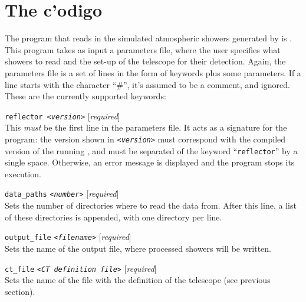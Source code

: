 \afterpage{\clearpage}

\clearpage

\section{The c'odigo }
\label{sec:reflector}
%
The program that reads in the simulated atmospheric showers generated
by \CORSIKA is . This program takes as input a parameters
file, where the user specifies what showers to read and the set-up of
the telescope for their detection. Again, the parameters file is a set
of lines in the form of keywords plus some parameters. If a line
starts with the character ``\#'', it's assumed to be a comment, and
ignored. These are the currently supported keywords:

\begin{Uentry}
  
\item[\texttt{reflector <\emph{version}>}]
%
  [\emph{required}] \\
  This \emph{must} be the first line in the parameters file. It acts
  as a signature for the program: the version shown in
  \texttt{<\emph{version}>} must correspond with the compiled version
  of the running , and must be separated of the keyword
  ``\texttt{reflector}'' by a single space.  Otherwise, an error
  message is displayed and the program stops its execution.
  
\item[\texttt{data\_paths} \quad
  \texttt{<\emph{number}>}]
%
  [\emph{required}] \\
  Sets the number of directories where to read the data from. After
  this line, a list of these directories is appended, with one
  directory per line.

\item[\texttt{output\_file} \quad
  \texttt{<\emph{filename}>}]
%
  [\emph{required}] \\
  Sets the name of the output file, where processed showers will be
  written.

\item[\texttt{ct\_file} \quad
  \texttt{<\emph{CT definition file}>}]
%
  [\emph{required}] \\
  Sets the name of the file with the definition of the telescope (see
  previous section).


\end{Uentry}
